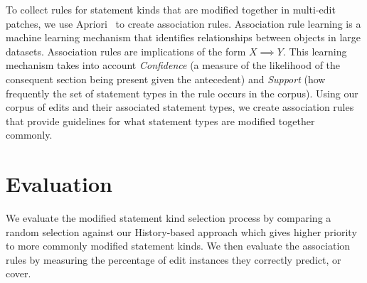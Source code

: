 \documentclass[sigconf]{acmart}
\begin{document}

To collect rules for statement kinds that are modified together in
multi-edit patches, we use Apriori~\cite{Agrawal94} to create
association rules.
Association rule learning is a machine learning mechanism that identifies
relationships between objects in large datasets. 
Association rules are implications of the
form $X \implies Y$.
This learning mechanism takes into 
account \textit{Confidence} (a measure of the likelihood 
of the consequent section being present given the 
antecedent) and \textit{Support} (how frequently the set of
statement types in the rule occurs in the corpus).
Using our corpus of edits and their associated statement types, 
we create association rules that provide guidelines
for what statement types are modified together commonly. 

\section{Evaluation}
\label{eval}

We evaluate the modified statement kind selection process
by comparing a random selection against our History-based 
approach which gives higher priority to more commonly 
modified statement kinds. We then evaluate the association
rules by measuring the percentage of edit instances they correctly predict, or 
cover.
\end{document}
